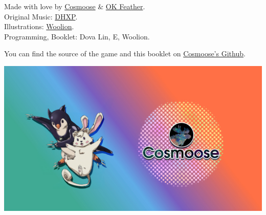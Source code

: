 \documentclass{article}
\begin{document}
Made with love by \href{https://cosmoose.org/}{Cosmoose} \& \href{https://okfeather.com/}{OK Feather}.\\
Original Music: \href{https://linktr.ee/dhxp}{DHXP}.\\
Illustrations: \href{https://twitter.com/wooliondraws}{Woolion}.\\
Programming, Booklet: Dova Lin, E, Woolion.

You can find the source of the game and this booklet on
\href{https://github.com/cosmoosic/cc-star}{Cosmoose's Github}.

\vspace*{\fill}

\begin{center}
    \includegraphics[height=.35\paperheight]{img/ccend}
\end{center}


\clearpage
\end{document}

